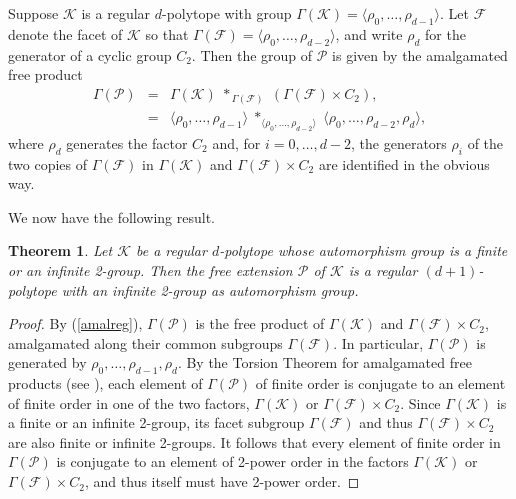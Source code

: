 \documentclass[12pt]{amsart}
\newtheorem{theorem}{Theorem}[section]
\theoremstyle{definition}
\begin{document}
Suppose $\mathcal K$ is a regular $d$-polytope with group $\Gamma(\mathcal{K})=\langle\rho_{0},\ldots,\rho_{d-1}\rangle$. Let $\mathcal F$ denote the facet of $\mathcal K$ so that $\Gamma(\mathcal{F})=\langle\rho_{0},\ldots,\rho_{d-2}\rangle$, and write $\rho_d$ for the generator of a cyclic group $C_2$. Then the group of $\mathcal P$ is given by the amalgamated free product 
\begin{equation}
\label{amalreg}
\begin{array}{rcl}
\Gamma(\mathcal{P}) &=& 
\Gamma(\mathcal{K})\; {\mathop{\ast}}_{\,\Gamma(\mathcal{F})} \;(\Gamma(\mathcal{F}) \times C_{2}),\\[.05in]
&=&\langle\rho_{0},\ldots,\rho_{d-1}\rangle\;{\mathop{\ast}}_{\langle\rho_{0},\ldots,\rho_{d-2}\rangle}\; \langle\rho_{0},\ldots,\rho_{d-2},\rho_d\rangle,
\end{array}
\end{equation}
where $\rho_d$ generates the factor $C_2$ and, for $i = 0,\ldots,d-2$, the generators $\rho_{i}$ of the two copies of $\Gamma(\mathcal{F})$ in $\Gamma(\mathcal{K})$ and $\Gamma(\mathcal{F}) \times C_{2}$ are identified in the obvious way. 
\smallskip

We now have the following result.

\begin{theorem}
\label{freeextreg}
Let $\mathcal K$ be a regular $d$-polytope whose automorphism group is a finite or an infinite 2-group. Then the free extension $\mathcal P$ of $\mathcal K$ is a regular $(d+1)$-polytope with an infinite 2-group as automorphism group.
\end{theorem}

\begin{proof}
By (\ref{amalreg}), $\Gamma(\mathcal{P})$ is the free product of $\Gamma(\mathcal{K})$ and $\Gamma(\mathcal{F}) \times C_{2}$, amalgamated along their common subgroups $\Gamma(\mathcal{F})$. In particular, $\Gamma(\mathcal{P})$ is generated by $\rho_0,\ldots,\rho_{d-1},\rho_d$. By the Torsion Theorem for amalgamated free products (see \cite{LynSch1977}), each element of $\Gamma(\mathcal{P})$ of finite order is conjugate to an element of finite order in one of the two factors, $\Gamma(\mathcal{K})$ or $\Gamma(\mathcal{F})\times C_2$. Since $\Gamma(\mathcal{K})$ is a finite or an infinite 2-group, its facet subgroup $\Gamma(\mathcal{F})$ and thus $\Gamma(\mathcal{F})\times C_2$ are also finite or infinite 2-groups. It follows that every element of finite order in $\Gamma(\mathcal{P})$ is conjugate to an element of 2-power order in the factors $\Gamma(\mathcal{K})$ or $\Gamma(\mathcal{F})\times C_2$, and thus itself must have 2-power order.
\end{proof}
\medskip
\end{document}
